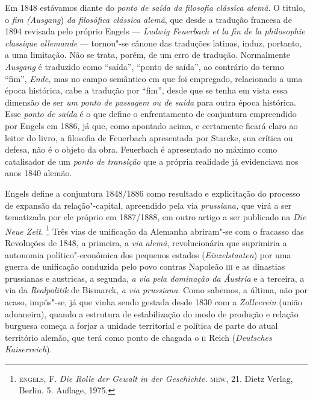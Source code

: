 Em 1848 estávamos diante do \emph{ponto de saída da filosofia clássica
alemã}. O titulo, o \emph{fim (Ausgang}) \emph{da filosófica clássica
alemã}, que desde a tradução francesa de 1894 revisada pelo próprio
Engels --- \emph{Ludwig Feuerbach et la fin de la philosophie classique
allemande} --- tornou"-se cânone das traduções latinas, induz, portanto, a
uma limitação. Não se trata, porém, de um erro de tradução. Normalmente
\emph{Ausgang} é traduzido como ``saída'', ``ponto de saída'', ao
contrário do termo ``fim'', \emph{Ende,} mas no campo semântico em que
foi empregado, relacionado a uma época histórica, cabe a tradução por
``fim'', desde que se tenha em vista essa dimensão de ser \emph{um ponto
de passagem ou de saída} para outra época histórica. Esse \emph{ponto de
saída} é o que define o enfrentamento de conjuntura empreendido por
Engels em 1886, já que, como apontado acima, e certamente ficará claro
ao leitor do livro, a filosofia de Feuerbach apresentada por Starcke,
sua crítica ou defesa, não é o objeto da obra. Feuerbach é apresentado
no máximo como catalisador de um \emph{ponto de transição} que a própria
realidade já evidenciava nos anos 1840 alemão.

Engels define a conjuntura 1848/1886 como resultado e explicitação do
processo de expansão da relação"-capital, apreendido pela via
\emph{prussiana,} que virá a ser tematizada por ele próprio em
1887/1888, em outro artigo a ser publicado na \emph{Die Neue Zeit}.
\footnote{\textsc{engels}, F. \emph{Die Rolle der Gewalt in der Geschichte.} \textsc{mew},
  21. Dietz Verlag, Berlin. 5. Auflage, 1975.} Três vias de unificação
da Alemanha abriram"-se com o fracasso das Revoluções de 1848, a
primeira, a \emph{via alemã}, revolucionária que suprimiria a autonomia
político"-econômica dos pequenos estados (\emph{Einzelstaaten}) por uma
guerra de unificação conduzida pelo povo contras Napoleão \textsc{iii} e as
dinastias prussianas e austricas, a segunda, \emph{a via pela dominação
da Áustria} e a terceira, a via da \emph{Realpolitik} de Bismarck, \emph{a via prussiana}. Como sabemos, a última, não por acaso, impôs"-se, já
que vinha sendo gestada desde 1830 com a \emph{Zollverein} (união
aduaneira), quando a estrutura de estabilização do modo de produção e
relação burguesa começa a forjar a unidade territorial e política de
parte do atual território alemão, que terá como ponto de chagada o \textsc{ii}
Reich (\emph{Deutsches Kaiserreich}).

